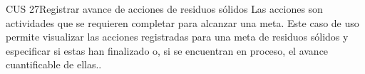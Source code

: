 
\begin{UseCase}{CUS 27}{Registrar avance de acciones de residuos sólidos}
    {
	Las acciones son actividades que se requieren completar para alcanzar una meta. Este caso de uso permite visualizar las acciones registradas para una meta de residuos sólidos y especificar si estas han finalizado o, si se encuentran en proceso, el avance cuantificable de ellas..
    }
    

    


\end{UseCase}
